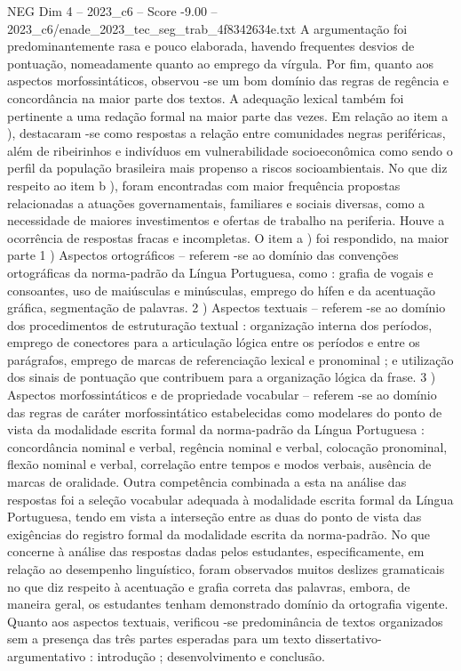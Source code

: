 \begin{textsample}{NEG Dim 4 – 2023\_c6 – Score -9.00 – 2023\_c6/enade\_2023\_tec\_seg\_trab\_4f8342634e.txt}
A argumentação foi predominantemente rasa e pouco elaborada, havendo frequentes desvios de pontuação, nomeadamente quanto ao emprego da vírgula.
Por fim, quanto aos aspectos morfossintáticos, observou -se um bom domínio das regras de regência e concordância na maior parte dos textos.
A adequação lexical também foi pertinente a uma redação formal na maior parte das vezes.
Em relação ao item a ), destacaram -se como respostas a relação entre comunidades negras periféricas, além de ribeirinhos e indivíduos em vulnerabilidade socioeconômica como sendo o perfil da população brasileira mais propenso a riscos socioambientais.
No que diz respeito ao item b ), foram encontradas com maior frequência propostas relacionadas a atuações governamentais, familiares e sociais diversas, como a necessidade de maiores investimentos e ofertas de trabalho na periferia.
Houve a ocorrência de respostas fracas e incompletas.
O item a ) foi respondido, na maior parte 1 ) Aspectos ortográficos – referem -se ao domínio das convenções ortográficas da norma-padrão da Língua Portuguesa, como : grafia de vogais e consoantes, uso de maiúsculas e minúsculas, emprego do hífen e da acentuação gráfica, segmentação de palavras. 2 ) Aspectos textuais – referem -se ao domínio dos procedimentos de estruturação textual : organização interna dos períodos, emprego de conectores para a articulação lógica entre os períodos e entre os parágrafos, emprego de marcas de referenciação lexical e pronominal ; e utilização dos sinais de pontuação que contribuem para a organização lógica da frase. 3 ) Aspectos morfossintáticos e de propriedade vocabular – referem -se ao domínio das regras de caráter morfossintático estabelecidas como modelares do ponto de vista da modalidade escrita formal da norma-padrão da Língua Portuguesa : concordância nominal e verbal, regência nominal e verbal, colocação pronominal, flexão nominal e verbal, correlação entre tempos e modos verbais, ausência de marcas de oralidade.
Outra competência combinada a esta na análise das respostas foi a seleção vocabular adequada à modalidade escrita formal da Língua Portuguesa, tendo em vista a interseção entre as duas do ponto de vista das exigências do registro formal da modalidade escrita da norma-padrão.
No que concerne à análise das respostas dadas pelos estudantes, especificamente, em relação ao desempenho linguístico, foram observados muitos deslizes gramaticais no que diz respeito à acentuação e grafia correta das palavras, embora, de maneira geral, os estudantes tenham demonstrado domínio da ortografia vigente.
Quanto aos aspectos textuais, verificou -se predominância de textos organizados sem a presença das três partes esperadas para um texto dissertativo-argumentativo : introdução ; desenvolvimento e conclusão.

\end{textsample}
